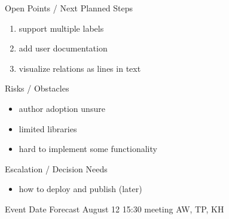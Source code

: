 \documentclass[]{kiesgrube}
\begin{document}
\begin{poster}
\begin{posterbox}[name=open,column=1,below=description]{Open Points / Next Planned Steps}
\begin{enumerate}
\item support multiple labels
\item add user documentation
\item visualize relations as lines in text
\end{enumerate}
\end{posterbox}
\begin{posterbox}[name=risks,column=1,below=open]{Risks / Obstacles}
\begin{itemize}
\item author adoption unsure
\item limited libraries
\item hard to implement some functionality 
\end{itemize}
\end{posterbox}
\begin{posterbox}[name=escalation,column=1,below=risks]{Escalation / Decision Needs}
\begin{itemize}
\item how to deploy and publish (later)
\end{itemize}
\end{posterbox}
\begin{posterbox}[name=event,below=progress,]{Event Date Forecast}
August 12 15:30 meeting AW, TP, KH
\end{posterbox}


\end{poster}
\end{document}
